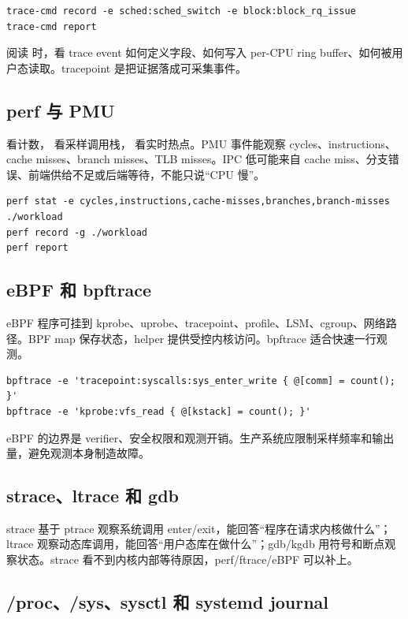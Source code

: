 \begin{lstlisting}
trace-cmd record -e sched:sched_switch -e block:block_rq_issue
trace-cmd report
\end{lstlisting}

阅读  时，看 trace event 如何定义字段、如何写入 per-CPU ring buffer、如何被用户态读取。tracepoint 是把证据落成可采集事件。

\subsection{perf 与 PMU}

 看计数， 看采样调用栈， 看实时热点。PMU 事件能观察 cycles、instructions、cache misses、branch misses、TLB misses。IPC 低可能来自 cache miss、分支错误、前端供给不足或后端等待，不能只说“CPU 慢”。

\begin{lstlisting}
perf stat -e cycles,instructions,cache-misses,branches,branch-misses ./workload
perf record -g ./workload
perf report
\end{lstlisting}

\subsection{eBPF 和 bpftrace}

eBPF 程序可挂到 kprobe、uprobe、tracepoint、profile、LSM、cgroup、网络路径。BPF map 保存状态，helper 提供受控内核访问。bpftrace 适合快速一行观测。

\begin{lstlisting}
bpftrace -e 'tracepoint:syscalls:sys_enter_write { @[comm] = count(); }'
bpftrace -e 'kprobe:vfs_read { @[kstack] = count(); }'
\end{lstlisting}

eBPF 的边界是 verifier、安全权限和观测开销。生产系统应限制采样频率和输出量，避免观测本身制造故障。

\subsection{strace、ltrace 和 gdb}

strace 基于 ptrace 观察系统调用 enter/exit，能回答“程序在请求内核做什么”；ltrace 观察动态库调用，能回答“用户态库在做什么”；gdb/kgdb 用符号和断点观察状态。strace 看不到内核内部等待原因，perf/ftrace/eBPF 可以补上。

\subsection{/proc、/sys、sysctl 和 systemd journal}

